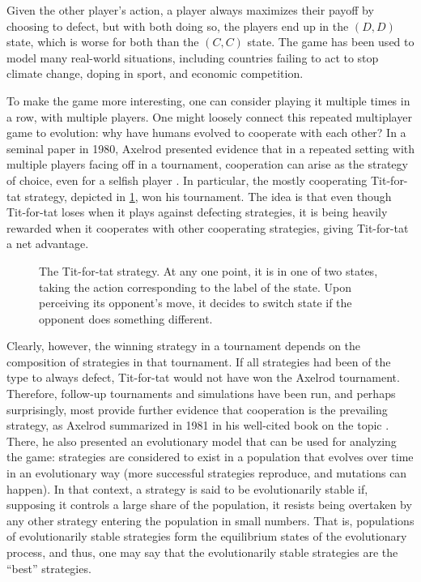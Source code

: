 \documentclass[12pt]{article}
\theoremstyle{definition}
\theoremstyle{remark}
\begin{document}
Given the other player's action, a player always maximizes their payoff by choosing to defect, but with both doing so, the players end up in the $(D, D)$ state, which is worse for both than the $(C, C)$ state. The game has been used to model many real-world situations, including countries failing to act to stop climate change, doping in sport, and economic competition.

To make the game more interesting, one can consider playing it multiple times in a row, with multiple players. One might loosely connect this repeated multiplayer game to evolution: why have humans evolved to cooperate with each other? In a seminal paper in 1980, Axelrod presented evidence that in a repeated setting with multiple players facing off in a tournament, cooperation can arise as the strategy of choice, even for a selfish player \cite{axelrod1980effective}. In particular, the mostly cooperating Tit-for-tat strategy, depicted in \cref{tftfigure}, won his tournament. The idea is that even though Tit-for-tat loses when it plays against defecting strategies, it is being heavily rewarded when it cooperates with other cooperating strategies, giving Tit-for-tat a net advantage.

\begin{figure}
  \centering
  \caption{The Tit-for-tat strategy. At any one point, it is in one of two states, taking the action corresponding to the label of the state. Upon perceiving its opponent's move, it decides to switch state if the opponent does something different.}
  \label{tftfigure}
\end{figure}

Clearly, however, the winning strategy in a tournament depends on the composition of strategies in that tournament. If all strategies had been of the type to always defect, Tit-for-tat would not have won the Axelrod tournament. Therefore, follow-up tournaments and simulations have been run, and perhaps surprisingly, most provide further evidence that cooperation is the prevailing strategy, as Axelrod summarized in 1981 in his well-cited book on the topic  \cite{axelrod1981evolution}. There, he also presented an evolutionary model that can be used for analyzing the game: strategies are considered to exist in a population that evolves over time in an evolutionary way (more successful strategies reproduce, and mutations can happen). In that context, a strategy is said to be evolutionarily stable if, supposing it controls a large share of the population, it resists being overtaken by any other strategy entering the population in small numbers. That is, populations of evolutionarily stable strategies form the equilibrium states of the evolutionary process, and thus, one may say that the evolutionarily stable strategies are the ``best'' strategies.
\end{document}

